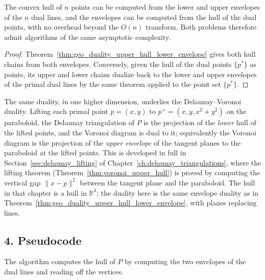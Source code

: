 \begin{corollary}\label{cor:geo_duality_hull_by_duality}
  The convex hull of $n$ points can be computed from the lower and upper
  envelopes of the $n$ dual lines, and the envelopes can be computed from
  the hull of the dual points, with no overhead beyond the $O(n)$ transform.
  Both problems therefore admit algorithms of the same asymptotic
  complexity.
\end{corollary}

\begin{proof}
  Theorem~\ref{thm:geo_duality_upper_hull_lower_envelope} gives both
  hull chains from both envelopes. Conversely, given the hull of the dual
  points $\{p^*\}$ as points, its upper and lower chains dualize back to the
  lower and upper envelopes of the primal dual lines by the same theorem
  applied to the point set $\{p^*\}$.
\end{proof}

The same duality, in one higher dimension, underlies the Delaunay--Voronoi
duality. Lifting each primal point $p = (x,y)$ to
$p^+ = (x, y, x^2 + y^2)$ on the paraboloid, the Delaunay triangulation of
$P$ is the projection of the \emph{lower} hull of the lifted points, and the
Voronoi diagram is dual to it; equivalently the Voronoi diagram is the
projection of the \emph{upper envelope} of the tangent planes to the
paraboloid at the lifted points. This is developed in full in
Section~\ref{sec:delaunay_lifting} of Chapter~\ref{ch:delaunay_triangulations},
where the lifting theorem
(Theorem~\ref{thm:voronoi_upper_hull}) is proved by computing the vertical
gap $\|x - p\|^2$ between the tangent plane and the paraboloid. The hull in
that chapter is a hull in $\mathbb{R}^3$; the duality here is the same
envelope duality as in Theorem~\ref{thm:geo_duality_upper_hull_lower_envelope},
with planes replacing lines.

\subsection{4. Pseudocode}

The algorithm computes the hull of $P$ by computing the two envelopes of the
dual lines and reading off the vertices.

